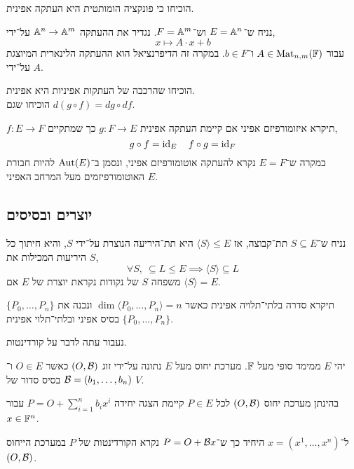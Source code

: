 \begin{exercise}
	הוכיחו כי פונקציה הומותטית היא העתקה אפינית.
\end{exercise}
\begin{example}
	נניח ש־$E = \mathbb{A}^n$ וש־$F = \mathbb{A}^m$.
	נגדיר את ההעתקה $\mathbb{A}^n \to \mathbb{A}^m$ על־ידי,
	\[
		x \mapsto A \cdot x + b
	\]
	עבור $A \in \operatorname{Mat}_{n, m}(\mathbb{F})$ ו־$b \in F$.
	במקרה זה הדיפרנציאל הוא ההעתקה הלינארית המיוצגת על־ידי $A$.
\end{example}
\begin{exercise}
	הוכיחו שהרכבה של העתקות אפיניות היא אפינית. \\
	הוכיחו שגם $d(g \circ f) = dg \circ df$.
\end{exercise}
\begin{definition}
	$f: E \to F$ תיקרא איזומורפיזם אפיני אם קיימת העתקה אפינית $g : F \to E$ כך שמתקיים,
	\[
		g \circ f = \operatorname{id}_E
		\quad
		f \circ g = \operatorname{id}_F
	\]
	במקרה ש־$E = F$ נקרא להעתקה אוטומורפיזם אפיני, ונסמן ב־$\operatorname{Aut}(E)$ להיות חבורת האוטומורפיזמים מעל המרחב האפיני $E$.
\end{definition}

\subsection{יוצרים ובסיסים}
\begin{definition}
	נניח ש־$S \subseteq E$ תת־קבוצה, אז $\langle S \rangle \le E$ היא תת־היריעה הנוצרת על־ידי $S$, והיא חיתוך כל היריעות המכילות את $S$,
	\[
		\forall S,\ \subseteq L \le E \implies \langle S \rangle \subseteq L
	\]
	משפחה $S$ של נקודות נקראת יוצרת של $E$ אם $\langle S \rangle = E$.
\end{definition}
\begin{definition}
	$\{ P_0, \ldots, P_n \}$ תיקרא סדרה בלתי־תלויה אפינית כאשר $\dim \langle P_0, \ldots, P_n \rangle = n$ ונכנה את $\{ P_0, \ldots, P_n \}$ בסיס אפיני ובלתי־תלוי אפינית.
\end{definition}
נעבור עתה לדבר על קורדינטות.
\begin{definition}
	יהי $E$ ממימד סופי מעל $\mathbb{F}$.
	מערכת יחוס מעל $E$ נתונה על־ידי זוג $(O, \mathcal{B})$ כאשר $O \in E$ ו־$\mathcal{B} = (b_1, \ldots, b_n)$ בסיס סדור של $V$.
\end{definition}
\begin{proposition}
	בהינתן מערכת יחוס $(O, \mathcal{B})$ לכל $P \in E$ קיימת הצגה יחידה $P = O + \sum_{i = 1}^n b_i x^i$ עבור $x \in \mathbb{F}^n$.
\end{proposition}
\begin{definition}[קורדינטה]
	ל־$x = (x^1, \ldots, x^n)$ היחיד כך ש־$P = O + \mathcal{B} x$ נקרא הקורדינטות של $P$ במערכת הייחוס $(O, \mathcal{B})$.
\end{definition}

